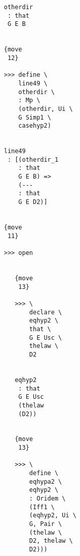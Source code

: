 \documentclass[12pt]{article}
\begin{document}
\begin{verbatim}
                                    otherdir 
                                     : that 
                                     G E B


                                    {move 
                                     12}

                                    >>> define \
                                        line49 \
                                        otherdir \
                                        : Mp \
                                        (otherdir, Ui \
                                        G Simp1 \
                                        casehyp2)


                                    line49 
                                     : [(otherdir_1 
                                        : that 
                                        G E B) => 
                                        (--- 
                                        : that 
                                        G E D2)]


                                    {move 
                                     11}

                                    >>> open


                                       {move 
                                        13}

                                       >>> \
                                           declare \
                                           eqhyp2 \
                                           that \
                                           G E Usc \
                                           thelaw \
                                           D2


                                       eqhyp2 
                                        : that 
                                        G E Usc 
                                        (thelaw 
                                        (D2))


                                       {move 
                                        13}

                                       >>> \
                                           define \
                                           eqhypa2 \
                                           eqhyp2 \
                                           : Oridem \
                                           (Iff1 \
                                           (eqhyp2, Ui \
                                           G, Pair \
                                           (thelaw \
                                           D2, thelaw \
                                           D2)))



\end{verbatim}
\end{document}
